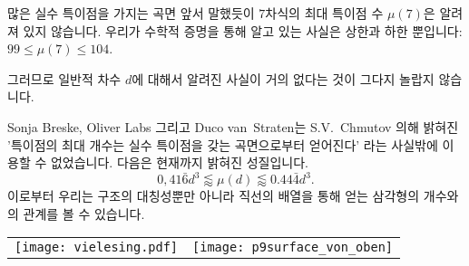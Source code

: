\begin{surferPage}[216개의 특이점]{많은 실수 특이점을 가지는 곡면}
    앞서 말했듯이 $7$차식의 최대 특이점 수 $\mu(7)$은 알려져 있지 않습니다. 우리가 수학적 증명을 통해 알고 있는 사실은 상한과 하한 뿐입니다:
$99\le \mu(7) \le 104$.


    그러므로 일반적 차수 $d$에 대해서 알려진 사실이 거의 없다는 것이 그다지 놀랍지 않습니다. 

    Sonja Breske, Oliver Labs 그리고 Duco van~Straten는 S.V.\ Chmutov 의해 밝혀진 '특이점의 최대 개수는 실수 특이점을 갖는 곡면으로부터 얻어진다' 라는 사실밖에 이용할 수 없었습니다. 다음은 현재까지 밝혀진 성질입니다.
    \[0,41\bar{6}d^3 \lessapprox \mu(d) \lessapprox 0.44\bar{4} d^3.\]
    이로부터 우리는 구조의 대칭성뿐만 아니라 직선의 배열을 통해 얻는 삼각형의 개수와의 관계를 볼 수 있습니다. 

    \begin{center}
      \begin{tabular}{c@{\qquad}c}
        \texttt{[image: vielesing.pdf]}
        &
        \texttt{[image: p9surface\_von\_oben]}
      \end{tabular}
    \end{center}
\end{surferPage}
